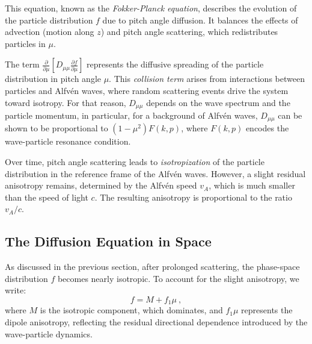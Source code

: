 This equation, known as the \emph{Fokker-Planck equation}, describes the evolution of the particle distribution \( f \) due to pitch angle diffusion. It balances the effects of advection (motion along \( z \)) and pitch angle scattering, which redistributes particles in \( \mu \).

The term \( \frac{\partial}{\partial \mu} \left[ D_{\mu\mu} \frac{\partial f}{\partial \mu} \right] \) represents the diffusive spreading of the particle distribution in pitch angle \( \mu \). This \emph{collision term} arises from interactions between particles and Alfvén waves, where random scattering events drive the system toward isotropy.
%
For that reason, \( D_{\mu\mu} \) depends on the wave spectrum and the particle momentum, in particular, for a background of Alfvén waves, \( D_{\mu\mu} \) can be shown to be proportional to \( (1 - \mu^2) F(k, p) \), where \( F(k, p) \) encodes the wave-particle resonance condition. 

Over time, pitch angle scattering leads to \emph{isotropization} of the particle distribution in the reference frame of the Alfvén waves. However, a slight residual anisotropy remains, determined by the Alfvén speed \( v_A \), which is much smaller than the speed of light \( c \). The resulting anisotropy is proportional to the ratio \( v_A / c \).


\subsection{The Diffusion Equation in Space}

As discussed in the previous section, after prolonged scattering, the phase-space distribution \( f \) becomes nearly isotropic. To account for the slight anisotropy, we write:
\begin{equation}
f = M + f_1 \mu~,
\end{equation}
where \( M \) is the isotropic component, which dominates, and \( f_1 \mu \) represents the dipole anisotropy, reflecting the residual directional dependence introduced by the wave-particle dynamics.

